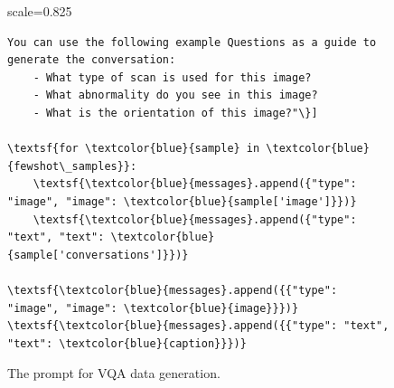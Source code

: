 \begin{figure}[t]
\begin{minipage}{1\linewidth}
\begin{adjustbox}{scale=0.825}
\begin{minipage}{1.2\columnwidth}
\begin{Verbatim}[frame=single, numbersep=5pt,
                     commandchars=\\\{\}, breaklines=true,  
                     breaksymbolleft={}, breaksymbolright={}]
    You can use the following example Questions as a guide to generate the conversation:
    - What type of scan is used for this image?
    - What abnormality do you see in this image?
    - What is the orientation of this image?"\}]

\textsf{for \textcolor{blue}{sample} in \textcolor{blue}{fewshot\_samples}}:
    \textsf{\textcolor{blue}{messages}.append({"type": "image", "image": \textcolor{blue}{sample['image']}})}
    \textsf{\textcolor{blue}{messages}.append({"type": "text", "text": \textcolor{blue}{sample['conversations']}})}

\textsf{\textcolor{blue}{messages}.append({{"type": "image", "image": \textcolor{blue}{image}}})}
\textsf{\textcolor{blue}{messages}.append({{"type": "text", "text": \textcolor{blue}{caption}}})}
    \end{Verbatim}
    \end{minipage}
    \end{adjustbox}
    \centering
    \vspace{-6pt}
    \caption{The prompt for VQA data generation.}
    \label{figC}
\end{minipage}

\end{figure}


